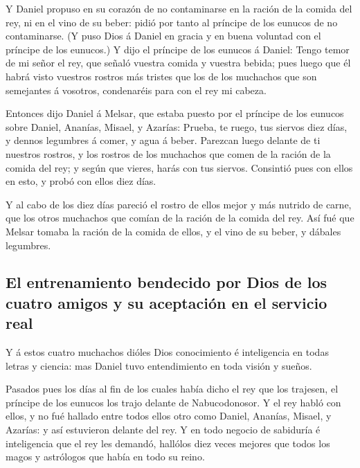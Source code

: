  Y Daniel propuso en su corazón de no contaminarse en la
ración de la comida del rey, ni en el vino de su beber: pidió por tanto
al príncipe de los eunucos de no contaminarse.  (Y puso
Dios á Daniel en gracia y en buena voluntad con el príncipe de los
eunucos.)  Y dijo el príncipe de los eunucos á Daniel:
Tengo temor de mi señor el rey, que señaló vuestra comida y vuestra
bebida; pues luego que él habrá visto vuestros rostros más tristes que
los de los muchachos que son semejantes á vosotros, condenaréis para con
el rey mi cabeza.

 Entonces dijo Daniel á Melsar, que estaba puesto por el
príncipe de los eunucos sobre Daniel, Ananías, Misael, y Azarías:
 Prueba, te ruego, tus siervos diez días, y dennos
legumbres á comer, y agua á beber.  Parezcan luego
delante de ti nuestros rostros, y los rostros de los muchachos que comen
de la ración de la comida del rey; y según que vieres, harás con tus
siervos.  Consintió pues con ellos en esto, y probó con
ellos diez días.

 Y al cabo de los diez días pareció el rostro de ellos
mejor y más nutrido de carne, que los otros muchachos que comían de la
ración de la comida del rey.  Así fué que Melsar tomaba
la ración de la comida de ellos, y el vino de su beber, y dábales
legumbres.

\hypertarget{el-entrenamiento-bendecido-por-dios-de-los-cuatro-amigos-y-su-aceptaciuxf3n-en-el-servicio-real}{%
\subsection{El entrenamiento bendecido por Dios de los cuatro amigos y
su aceptación en el servicio
real}\label{el-entrenamiento-bendecido-por-dios-de-los-cuatro-amigos-y-su-aceptaciuxf3n-en-el-servicio-real}}

 Y á estos cuatro muchachos dióles Dios conocimiento é
inteligencia en todas letras y ciencia: mas Daniel tuvo entendimiento en
toda visión y sueños.

 Pasados pues los días al fin de los cuales había dicho
el rey que los trajesen, el príncipe de los eunucos los trajo delante de
Nabucodonosor.  Y el rey habló con ellos, y no fué
hallado entre todos ellos otro como Daniel, Ananías, Misael, y Azarías:
y así estuvieron delante del rey.  Y en todo negocio de
sabiduría é inteligencia que el rey les demandó, hallólos diez veces
mejores que todos los magos y astrólogos que había en todo su reino.

